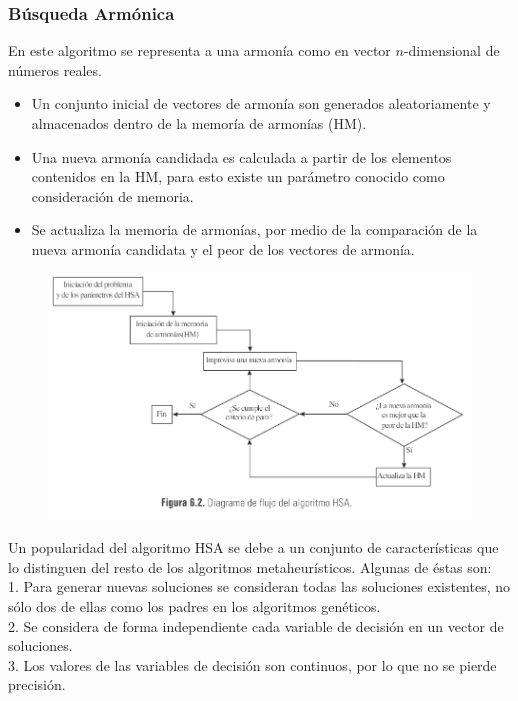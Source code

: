 \documentclass{article}
\begin{document}
\subsubsection{B\'usqueda Arm\'onica}
En este algoritmo se representa a una armonía como en vector $n$-dimensional de números reales.\cite{Coley (1999)}
\begin{itemize}
    \item Un conjunto inicial de vectores de armonía son generados aleatoriamente y almacenados dentro de la memoría de armonías (HM).
    \item Una nueva armonía candidada es calculada a partir de los elementos contenidos en la HM, para esto existe un parámetro conocido como consideración de memoria.
    \item Se actualiza la memoria de armonías, por medio de la comparación de la nueva armonía candidata y el peor de los vectores de armonía. 
\end{itemize}
\begin{figure}[H]
    \centering
    \includegraphics[scale=0.6]{imgs/hsa_diagrama.png}
\end{figure}
Un popularidad del algoritmo HSA se debe a un conjunto de características que lo distinguen del resto de los algoritmos metaheurísticos. Algunas de éstas son: \\ 
1. Para generar nuevas soluciones se consideran todas las soluciones existentes, no sólo dos de ellas como los padres en los algoritmos genéticos. \\ 
2. Se considera de forma independiente cada variable de decisión en un vector de soluciones. \\
3. Los valores de las variables de decisión son continuos, por lo que no se pierde precisión.
\end{document}
